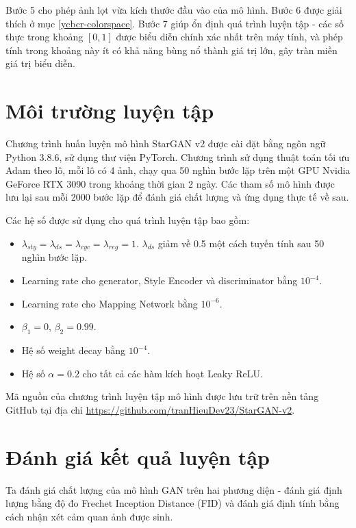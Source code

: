 \documentclass[12pt]{extreport}
\begin{document}
Bước 5 cho phép ảnh lọt vừa kích thước đầu vào của mô hình. Bước 6 được giải thích ở mục \ref{ycbcr-colorspace}. Bước 7 giúp ổn định quá trình luyện tập - các số thực trong khoảng $ [0, 1] $ được biểu diễn chính xác nhất trên máy tính, và phép tính trong khoảng này ít có khả năng bùng nổ thành giá trị lớn, gây tràn miền giá trị biểu diễn.

\section{Môi trường luyện tập}

Chương trình huấn luyện mô hình StarGAN v2 được cài đặt bằng ngôn ngữ Python 3.8.6, sử dụng thư viện PyTorch. Chương trình sử dụng thuật toán tối ưu Adam theo lô, mỗi lô có 4 ảnh, chạy qua 50 nghìn bước lặp trên một GPU Nvidia GeForce RTX 3090 trong khoảng thời gian 2 ngày. Các tham số mô hình được lưu lại sau mỗi 2000 bước lặp để đánh giá chất lượng và ứng dụng thực tế về sau.

Các hệ số được sử dụng cho quá trình luyện tập bao gồm:
\begin{itemize}
    \item $ \lambda_{sty} = \lambda_{ds} = \lambda_{cyc} = \lambda_{reg} = 1 $. $ \lambda_{ds} $ giảm về 0.5 một cách tuyến tính sau 50 nghìn bước lặp.
    \item Learning rate cho generator, Style Encoder và discriminator bằng $ 10^{-4} $.
    \item Learning rate cho Mapping Network bằng $ 10^{-6} $.
    \item $ \beta_1 = 0 $, $ \beta_2 = 0.99 $.
    \item Hệ số weight decay bằng $ 10^{-4} $.
    \item Hệ số $ \alpha = 0.2 $ cho tất cả các hàm kích hoạt Leaky ReLU.
\end{itemize}

Mã nguồn của chương trình luyện tập mô hình được lưu trữ trên nền tảng GitHub tại địa chỉ \href{https://github.com/tranHieuDev23/StarGAN-v2}{https://github.com/tranHieuDev23/StarGAN-v2}.

\section{Đánh giá kết quả luyện tập}

Ta đánh giá chất lượng của mô hình GAN trên hai phương diện - đánh giá định lượng bằng độ đo Frechet Inception Distance (FID) và đánh giá định tính bằng cách nhận xét cảm quan ảnh được sinh.
\end{document}
